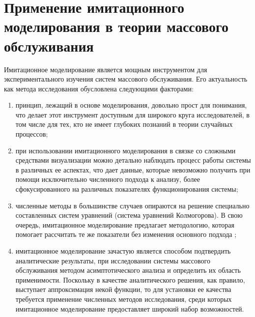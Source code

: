 \section {Применение имитационного моделирования в теории массового обслуживания}
Имитационное моделирование \cite{задорожный2011методы} является мощным инструментом для экспериментального изучения систем массового обслуживания. Его актуальность как метода исследования обусловлена следующими факторами:
\begin{enumerate}
	\item принцип, лежащий в основе моделирования, довольно прост для понимания, что делает этот инструмент доступным для широкого круга исследователей, в том числе для тех, кто не имеет глубоких познаний в теории случайных процессов;
	\item при использовании имитационного моделирования в связке со сложными средствами визуализации можно детально наблюдать процесс работы системы в различных ее аспектах, что дает данные, которые невозможно получить при помощи исключительно численного подхода к анализу, более сфокусированного на различных показателях функционирования системы; 
	\item численные методы в большинстве случаев опираются на решение специально составленных систем уравнений (система уравнений Колмогорова). В свою очередь, имитационное моделирование предлагает методологию, которая помогает рассчитать те же показатели без изменения основного подхода \cite{glynn1988simulation};
	\item имитационное моделирование зачастую является способом подтвердить аналитические результаты, при исследовании системы массового обслуживания методом асимптотического анализа и определить их область применимости. Поскольку в качестве аналитического решения, как правило, выступает аппроксимация некой функции, то для установки ее качества требуется применение численных методов исследования, среди которых имитационное моделирование предоставляет широкий набор возможностей.
\end{enumerate}

